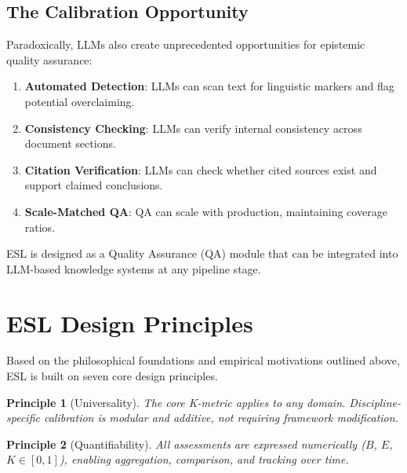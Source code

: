 \documentclass[11pt,a4paper]{article}
\newtheorem{principle}{Principle}[section]
\begin{document}
\subsection{The Calibration Opportunity}

Paradoxically, LLMs also create unprecedented opportunities for epistemic quality assurance:

\begin{enumerate}
    \item \textbf{Automated Detection}: LLMs can scan text for linguistic markers and flag potential overclaiming.
    \item \textbf{Consistency Checking}: LLMs can verify internal consistency across document sections.
    \item \textbf{Citation Verification}: LLMs can check whether cited sources exist and support claimed conclusions.
    \item \textbf{Scale-Matched QA}: QA can scale with production, maintaining coverage ratios.
\end{enumerate}

ESL is designed as a Quality Assurance (QA) module that can be integrated into LLM-based knowledge systems at any pipeline stage.


\section{ESL Design Principles}
\label{sec:design-principles}

Based on the philosophical foundations and empirical motivations outlined above, ESL is built on seven core design principles.

\begin{principle}[Universality]
\label{princ:universality}
The core K-metric applies to any domain. Discipline-specific calibration is modular and additive, not requiring framework modification.
\end{principle}

\begin{principle}[Quantifiability]
\label{princ:quantifiability}
All assessments are expressed numerically ($B$, $E$, $K \in [0,1]$), enabling aggregation, comparison, and tracking over time.
\end{principle}
\end{document}
